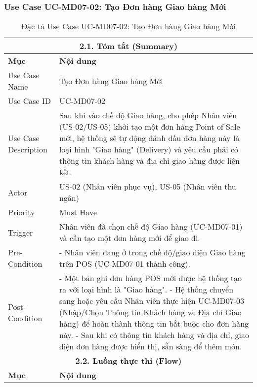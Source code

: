 \subsubsection{Use Case UC-MD07-02: Tạo Đơn hàng Giao hàng Mới}
\begin{longtable}{|m{4cm}|p{11cm}|}
\caption{Đặc tả Use Case UC-MD07-02: Tạo Đơn hàng Giao hàng Mới} \label{tab:uc_md07_02_final_full} \\
\hline
\multicolumn{2}{|c|}{\textbf{2.1. Tóm tắt (Summary)}} \\
\hline
\textbf{Mục} & \textbf{Nội dung} \\
\hline
\endhead %
\hline
\endfoot %
\hline
\endlastfoot %
Use Case Name & Tạo Đơn hàng Giao hàng Mới \\
\hline
Use Case ID & UC-MD07-02 \\
\hline
Use Case Description & Sau khi vào chế độ Giao hàng, cho phép Nhân viên (US-02/US-05) khởi tạo một đơn hàng Point of Sale mới, hệ thống sẽ tự động đánh dấu đơn hàng này là loại hình "Giao hàng" (Delivery) và yêu cầu phải có thông tin khách hàng và địa chỉ giao hàng được liên kết. \\
\hline
Actor & US-02 (Nhân viên phục vụ), US-05 (Nhân viên thu ngân) \\
\hline
Priority & Must Have \\
\hline
Trigger & Nhân viên đã chọn chế độ Giao hàng (UC-MD07-01) và cần tạo một đơn hàng mới để giao đi. \\
\hline
Pre-Condition & - Nhân viên đang ở trong chế độ/giao diện Giao hàng trên POS (UC-MD07-01 thành công). \\
\hline
Post-Condition & - Một bản ghi đơn hàng POS mới được hệ thống tạo ra với loại hình là "Giao hàng". \newline - Hệ thống chuyển sang hoặc yêu cầu Nhân viên thực hiện UC-MD07-03 (Nhập/Chọn Thông tin Khách hàng và Địa chỉ Giao hàng) để hoàn thành thông tin bắt buộc cho đơn hàng này. \newline - Sau khi có thông tin khách hàng và địa chỉ, giao diện đơn hàng được hiển thị, sẵn sàng để thêm món. \\
\hline
\multicolumn{2}{|c|}{\textbf{2.2. Luồng thực thi (Flow)}} \\
\hline
\textbf{Mục} & \textbf{Nội dung} \\
\hline

\end{longtable}

